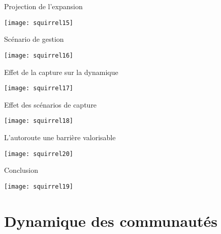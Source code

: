 \documentclass[]{beamer}
\begin{document}
\begin{frame}{Projection de l'expansion}
  \begin{center}
    \texttt{[image: squirrel15]}
  \end{center}
\end{frame}


\begin{frame}{Scénario de gestion}
  \begin{center}
    \texttt{[image: squirrel16]}
  \end{center}
\end{frame}


\begin{frame}{Effet de la capture sur la dynamique}
  \begin{center}
    \texttt{[image: squirrel17]}
  \end{center}
\end{frame}


\begin{frame}{Effet des scénarios de capture}
  \begin{center}
    \texttt{[image: squirrel18]}
  \end{center}
\end{frame}


\begin{frame}{L'autoroute une barrière valorisable}
  \begin{center}
    \texttt{[image: squirrel20]}
  \end{center}
\end{frame}


\begin{frame}{Conclusion}
  \begin{center}
    \texttt{[image: squirrel19]}
  \end{center}
\end{frame}

\section{Dynamique des communautés}


\end{document}

